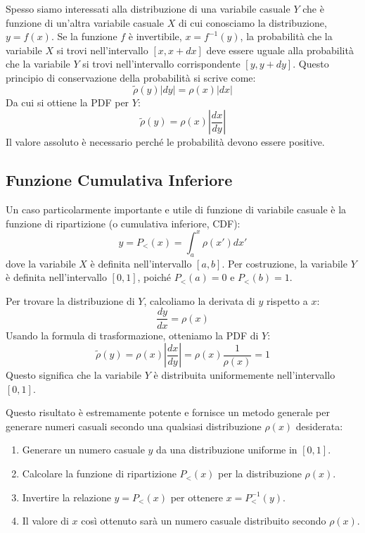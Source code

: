 Spesso siamo interessati alla distribuzione di una variabile casuale $Y$ che è funzione di un'altra variabile casuale $X$ di cui conosciamo la distribuzione, $y=f(x)$. Se la funzione $f$ è invertibile, $x=f^{-1}(y)$, la probabilità che la variabile $X$ si trovi nell'intervallo $[x, x+dx]$ deve essere uguale alla probabilità che la variabile $Y$ si trovi nell'intervallo corrispondente $[y, y+dy]$. Questo principio di conservazione della probabilità si scrive come:
\begin{equation}
\tilde{\rho}(y)|dy| = \rho(x)|dx|
\end{equation}
Da cui si ottiene la PDF per $Y$:
\begin{equation}
\tilde{\rho}(y) = \rho(x) \left|\frac{dx}{dy}\right|  
\end{equation}
Il valore assoluto è necessario perché le probabilità devono essere positive.

\subsection{Funzione Cumulativa Inferiore}

Un caso particolarmente importante e utile di funzione di variabile casuale è la funzione di ripartizione (o cumulativa inferiore, CDF):
\begin{equation}
y = P_<(x) = \int_a^x \rho(x')dx'
\end{equation}
dove la variabile $X$ è definita nell'intervallo $[a,b]$. Per costruzione, la variabile $Y$ è definita nell'intervallo $[0,1]$, poiché $P_<(a)=0$ e $P_<(b)=1$.

Per trovare la distribuzione di $Y$, calcoliamo la derivata di $y$ rispetto a $x$:
\begin{equation}
\frac{dy}{dx} = \rho(x)
\end{equation}
Usando la formula di trasformazione, otteniamo la PDF di $Y$:
\begin{equation}
\tilde{\rho}(y) = \rho(x) \left|\frac{dx}{dy}\right| = \rho(x) \frac{1}{\rho(x)} = 1
\end{equation}
Questo significa che la variabile $Y$ è distribuita uniformemente nell'intervallo $[0,1]$.

Questo risultato è estremamente potente e fornisce un metodo generale per generare numeri casuali secondo una qualsiasi distribuzione $\rho(x)$ desiderata:
\begin{enumerate}
    \item Generare un numero casuale $y$ da una distribuzione uniforme in $[0,1]$.
    \item Calcolare la funzione di ripartizione $P_<(x)$ per la distribuzione $\rho(x)$.
    \item Invertire la relazione $y = P_<(x)$ per ottenere $x = P_<^{-1}(y)$.
    \item Il valore di $x$ così ottenuto sarà un numero casuale distribuito secondo $\rho(x)$.
\end{enumerate}


